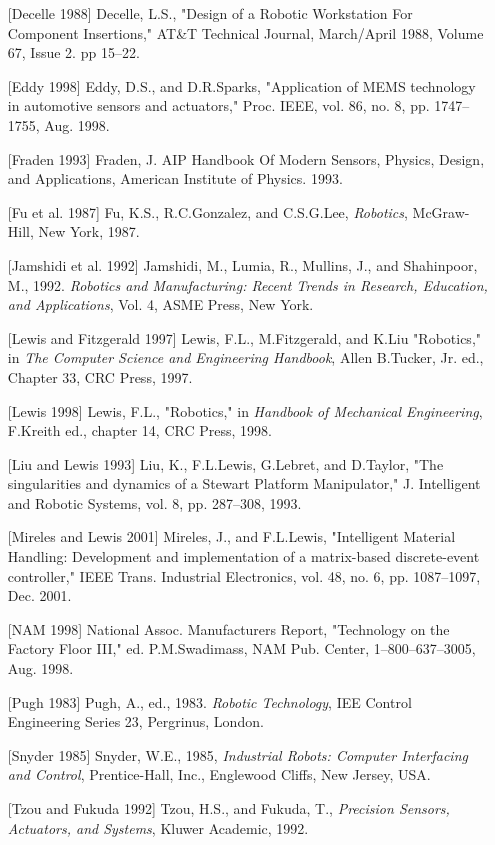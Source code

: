 \documentclass[UTF8,a4paper]{ctexart}
\begin{document}
\begin{enumerate}
    \item[{[Decelle 1988]}] Decelle, L.S., "Design of a Robotic Workstation For Component Insertions," AT\&T Technical Journal, March/April 1988, Volume 67, Issue 2. pp 15–22.
    \item[{[Eddy 1998]}] Eddy, D.S., and D.R.Sparks, "Application of MEMS technology in automotive sensors and actuators," Proc. IEEE, vol. 86, no. 8, pp. 1747–1755, Aug. 1998.
    \item[{[Fraden 1993]}] Fraden, J. AIP Handbook Of Modern Sensors, Physics, Design, and Applications, American Institute of Physics. 1993.
    \item[{[Fu et al. 1987]}] Fu, K.S., R.C.Gonzalez, and C.S.G.Lee, \textit{Robotics}, McGraw-Hill, New York, 1987.
    \item[{[Jamshidi et al. 1992]}] Jamshidi, M., Lumia, R., Mullins, J., and Shahinpoor, M., 1992. \textit{Robotics and Manufacturing: Recent Trends in Research, Education, and Applications}, Vol. 4, ASME Press, New York.
    \item[{[Lewis and Fitzgerald 1997]}] Lewis, F.L., M.Fitzgerald, and K.Liu "Robotics," in \textit{The Computer Science and Engineering Handbook}, Allen B.Tucker, Jr. ed., Chapter 33, CRC Press, 1997.
    \item[{[Lewis 1998]}] Lewis, F.L., "Robotics," in \textit{Handbook of Mechanical Engineering}, F.Kreith ed., chapter 14, CRC Press, 1998.
    \item[{[Liu and Lewis 1993]}] Liu, K., F.L.Lewis, G.Lebret, and D.Taylor, "The singularities and dynamics of a Stewart Platform Manipulator," J. Intelligent and Robotic Systems, vol. 8, pp. 287–308, 1993.
    \item[{[Mireles and Lewis 2001]}] Mireles, J., and F.L.Lewis, "Intelligent Material Handling: Development and implementation of a matrix-based discrete-event controller," IEEE Trans. Industrial Electronics, vol. 48, no. 6, pp. 1087–1097, Dec. 2001.
    \item[{[NAM 1998]}] National Assoc. Manufacturers Report, "Technology on the Factory Floor III," ed. P.M.Swadimass, NAM Pub. Center, 1–800–637–3005, Aug. 1998.
    \item[{[Pugh 1983]}] Pugh, A., ed., 1983. \textit{Robotic Technology}, IEE Control Engineering Series 23, Pergrinus, London.
    \item[{[Snyder 1985]}] Snyder, W.E., 1985, \textit{Industrial Robots: Computer Interfacing and Control}, Prentice-Hall, Inc., Englewood Cliffs, New Jersey, USA.
    \item[{[Tzou and Fukuda 1992]}] Tzou, H.S., and Fukuda, T., \textit{Precision Sensors, Actuators, and Systems}, Kluwer Academic, 1992.
\end{enumerate}
\end{document}
